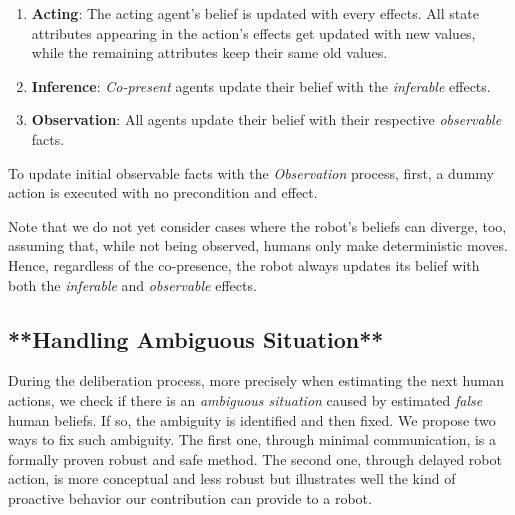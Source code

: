 \documentclass[letterpaper]{article} %
\begin{document}
\begin{enumerate}
    \item \textbf{Acting}: The acting agent's belief is updated with every effects. All state attributes appearing in the action's effects get updated with new values, while the remaining attributes keep their same old values.

    \item \textbf{Inference}: \textit{Co-present} agents update their belief with the \textit{inferable} effects.

    \item \textbf{Observation}: All agents update their belief with their respective \textit{observable} facts.
\end{enumerate}

To update initial observable facts with the \textit{Observation} process, first, a dummy action is executed with no precondition and effect.

Note that we do not yet consider cases where the robot's beliefs can diverge, too, assuming that, while not being observed, humans only make deterministic moves. Hence, regardless of the co-presence, the robot always updates its belief with both the \textit{inferable} and \textit{observable} effects.

\subsection{**Handling Ambiguous Situation**}

During the deliberation process, more precisely when estimating the next human actions, we check if there is an \textit{ambiguous situation} caused by estimated \textit{false} human beliefs. If so, the ambiguity is identified and then fixed. We propose two ways to fix such ambiguity. The first one, through minimal communication, is a formally proven robust and safe method. The second one, through delayed robot action, is more conceptual and less robust but illustrates well the kind of proactive behavior our contribution can provide to a robot.
\end{document}
